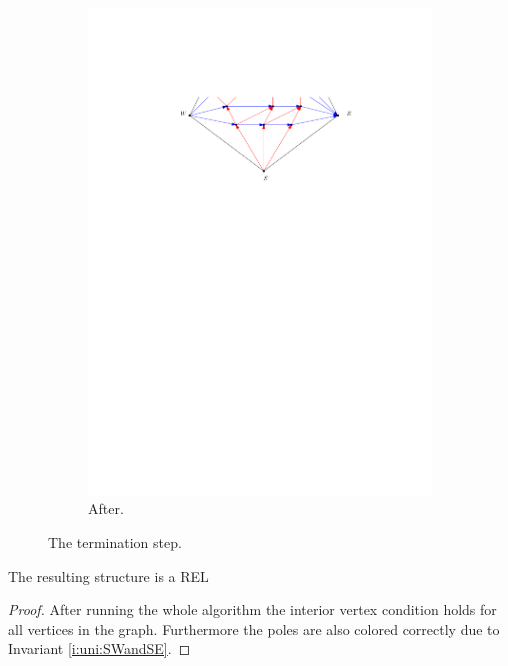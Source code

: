 \begin{figure}[h]
\begin{subfigure}[b]{0.45 \textwidth}
          \includegraphics[width =\textwidth]{unifiedAlgo/img/sweep/terminateAfter.pdf}
          \caption{After.}
      \end{subfigure}
      \caption{The termination step.}
      \label{fig:sweep:terminate}
    \end{figure}

    \begin{lemma}
      \label{lm:sweep:REL}
      The resulting structure is a REL
    \end{lemma}

    \begin{proof}
      After running the whole algorithm the interior vertex condition holds for all vertices in the graph. Furthermore the poles are also colored correctly due to Invariant \ref{i:uni:SWandSE}.
    \end{proof}

